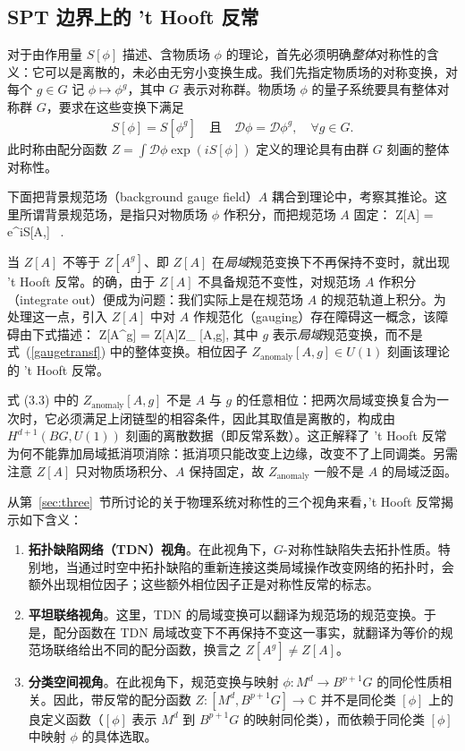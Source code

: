 \subsection{SPT 边界上的 't Hooft 反常}\label{sec:anomaly-SPT}

对于由作用量 $S[\phi]$ 描述、含物质场 $\phi$ 的理论，首先必须明确\emph{整体}对称性的含义：它可以是离散的，未必由无穷小变换生成。我们先指定物质场的对称变换，对每个 $g\in G$ 记 $\phi\mapsto \phi^g$，其中 $G$ 表示对称群。物质场 $\phi$ 的量子系统要具有整体对称群 $G$，要求在这些变换下满足
\begin{align}\label{gaugetransf}
S[\phi] = S[\phi^g] \quad \text{且} \quad \mathcal{D}\phi = \mathcal{D}\phi^g, \quad \forall g\in G.
\end{align}
此时称由配分函数 $Z = \int \mathcal{D}\phi \exp(iS[\phi])$ 定义的理论具有由群 $G$ 刻画的整体对称性。

下面把背景规范场（background gauge field）$A$ 耦合到理论中，考察其推论。这里所谓背景规范场，是指只对物质场 $\phi$ 作积分，而把规范场 $A$ 固定：
\be Z[A] = \int{}\phi e^{iS[A,\phi]} \ . \ee

当 $Z[A]$ 不等于 $Z[A^g]$、即 $Z[A]$ 在\emph{局域}规范变换下不再保持不变时，就出现 't Hooft 反常。的确，由于 $Z[A]$ 不具备规范不变性，对规范场 $A$ 作积分（integrate out）便成为问题：我们实际上是在规范场 $A$ 的规范轨道上积分。为处理这一点，引入 $Z[A]$ 中对 $A$ 作规范化（gauging）存在障碍这一概念，该障碍由下式描述：
\be
Z[A^g] = Z[A]\cdot Z_{} [A,g],
\ee
其中 $g$ 表示\emph{局域}规范变换，而不是式~(\ref{gaugetransf}) 中的整体变换。相位因子 $Z_{\text{anomaly}}[A,g] \in U(1)$ 刻画该理论的 't Hooft 反常。

\begin{yizhu}
式 (3.3) 中的 $Z_{\text{anomaly}}[A,g]$ 不是 $A$ 与 $g$ 的任意相位：把两次局域变换复合为一次时，它必须满足上闭链型的相容条件，因此其取值是离散的，构成由 $H^{d+1}(BG,U(1))$ 刻画的离散数据（即反常系数）。这正解释了 't Hooft 反常为何不能靠加局域抵消项消除：抵消项只能改变上边缘，改变不了上同调类。另需注意 $Z[A]$ 只对物质场积分、$A$ 保持固定，故 $Z_{\text{anomaly}}$ 一般不是 $A$ 的局域泛函。
\end{yizhu}

从第~\ref{sec:three}~节所讨论的关于物理系统对称性的三个视角来看，'t Hooft 反常揭示如下含义：
\begin{enumerate}
\item \textbf{拓扑缺陷网络（TDN）视角}。在此视角下，$G$-对称性缺陷失去拓扑性质。特别地，当通过时空中拓扑缺陷的重新连接这类局域操作改变网络的拓扑时，会额外出现相位因子；这些额外相位因子正是对称性反常的标志。
\item \textbf{平坦联络视角}。这里，TDN 的局域变换可以翻译为规范场的规范变换。于是，配分函数在 TDN 局域改变下不再保持不变这一事实，就翻译为等价的规范场联络给出不同的配分函数，换言之 $Z[A^g]\neq Z[A]$。
\item \textbf{分类空间视角}。在此视角下，规范变换与映射 $\phi: M^d\rightarrow B^{p+1}G$ 的同伦性质相关。因此，带反常的配分函数 $Z: [M^d, B^{p+1}G]\rightarrow \mathbb{C}$ 并不是同伦类 $[\phi]$ 上的良定义函数（$[\phi]$ 表示 $M^d$ 到 $B^{p+1}G$ 的映射同伦类），而依赖于同伦类 $[\phi]$ 中映射 $\phi$ 的具体选取。
\end{enumerate}

